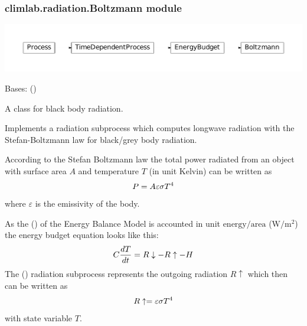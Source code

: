 \documentclass[a4paper,10pt,english]{sphinxmanual}
\begin{document}
\subsubsection{climlab.radiation.Boltzmann module}
\label{api/climlab.radiation:climlab-radiation-boltzmann-module}
\includegraphics{inheritance-658ce4f2d58cd543b03b338809a90b211995f932.pdf}
\label{api/climlab.radiation:module-climlab.radiation.Boltzmann}

\begin{fulllineitems}
\label{api/climlab.radiation:climlab.radiation.Boltzmann.Boltzmann}
Bases: {\hyperref[api/climlab.process:climlab.process.energy_budget.EnergyBudget]{\emph{}}} ()

A class for black body radiation.

Implements a radiation subprocess which computes longwave radiation
with the Stefan-Boltzmann law for black/grey body radiation.

According to the Stefan Boltzmann law the total power radiated from an 
object with surface area \(A\) and temperature \(T\) (in unit Kelvin)
can be written as
\begin{gather}
\begin{split}P = A \varepsilon \sigma T^4\end{split}\notag
\end{gather}
where \(\varepsilon\) is the emissivity of the body.

As the {\hyperref[api/climlab.process:climlab.process.energy_budget.EnergyBudget]{\emph{}}} () of the 
Energy Balance Model is accounted in unit \(\textrm{energy} / \textrm{area}\)
(\(\textrm{W}/ \textrm{m}^2\))
the energy budget equation looks like this:
\begin{gather}
\begin{split}C \frac{dT}{dt} = R\downarrow - R\uparrow - H  \end{split}\notag
\end{gather}
The {\hyperref[api/climlab.radiation:climlab.radiation.Boltzmann.Boltzmann]{\emph{}}} () radiation subprocess represents the outgoing radiation
\(R\uparrow\) which then can be written as
\begin{gather}
\begin{split}R\uparrow = \varepsilon \sigma T^4\end{split}\notag
\end{gather}
with state variable \(T\).


\end{fulllineitems}
\end{document}
